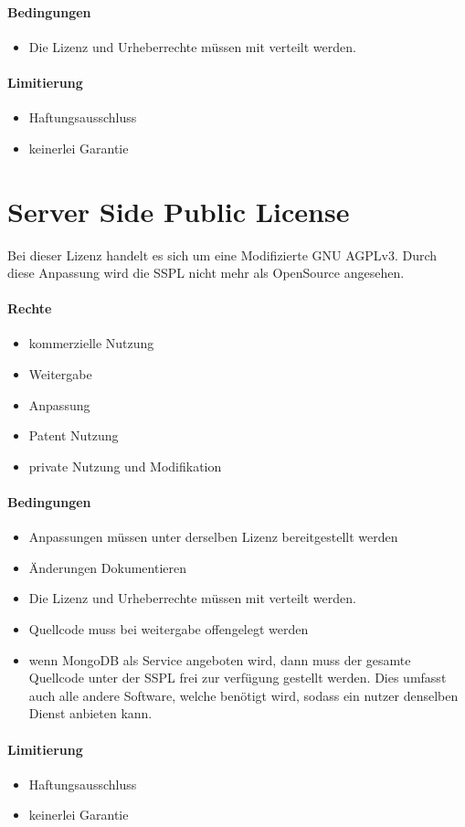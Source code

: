 \paragraph{Bedingungen}
\begin{itemize}
    \item Die Lizenz und Urheberrechte müssen mit verteilt werden.
\end{itemize}

\paragraph{Limitierung}
\begin{itemize}
    \item Haftungsausschluss
    \item keinerlei Garantie
\end{itemize}


\section{Server Side Public License}\label{sec:server-side-public-license}
Bei dieser Lizenz handelt es sich um eine Modifizierte GNU AGPLv3.
Durch diese Anpassung wird die SSPL nicht mehr als OpenSource angesehen.\cite{osi-sspl}

\paragraph{Rechte}
\begin{itemize}
    \item kommerzielle Nutzung
    \item Weitergabe
    \item Anpassung
    \item Patent Nutzung
    \item private Nutzung und Modifikation
\end{itemize}
\paragraph{Bedingungen}
\begin{itemize}
    \item Anpassungen müssen unter derselben Lizenz bereitgestellt werden
    \item Änderungen Dokumentieren
    \item Die Lizenz und Urheberrechte müssen mit verteilt werden.
    \item Quellcode muss bei weitergabe offengelegt werden
    \item wenn MongoDB als Service angeboten wird, dann muss der gesamte Quellcode unter der
    SSPL frei zur verfügung gestellt werden.
    Dies umfasst auch alle andere Software, welche benötigt wird, sodass ein nutzer denselben Dienst anbieten kann.
\end{itemize}

\paragraph{Limitierung}
\begin{itemize}
    \item Haftungsausschluss
    \item keinerlei Garantie
\end{itemize}
